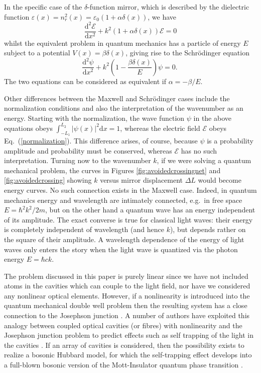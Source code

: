 \documentclass[twocolumn,english,pra,aps,superscriptaddress,floatfix]{revtex4-1}
\begin{document}
In the specific case of the $\delta$-function mirror, which is described by the dielectric function $\varepsilon(x)=n_{r}^{2}(x)=\varepsilon_{0}(1+ \alpha \delta(x))$, we have
\begin{equation}
\frac{\mathrm{d}^2 \mathcal{E}}{\mathrm{d} x^2}+ k^2(1+\alpha \delta(x)) \mathcal{E}=0
\label{eq:maxwelltimeindependent}
\end{equation}
whilst the equivalent problem in quantum mechanics has a particle of energy $E$ subject to a potential $V(x)=\beta \delta(x)$, giving rise to the
Schr\"{o}dinger equation 
\begin{equation}
\frac{\mathrm{d}^2 \psi}{\mathrm{d} x^2}+ k^2 \left(1- \frac{\beta \delta(x)}{E} \right) \psi=0 .\
\label{eq:schrodingertimeindependent}
\end{equation}
The two equations can be considered as equivalent if $\alpha = - \beta/E $.

Other differences between the Maxwell and Schr\"{o}dinger cases include the normalization conditions and also the interpretation of the wavenumber as an energy. Starting with the normalization, the wave function $\psi$ in the above equations  obeys $\int_{-L_{1}}^{L_{2}} \vert \psi(x) \vert^2 \mathrm{d} x = 1$, whereas the electric field $\mathcal{E}$ obeys Eq.\ (\ref{normalization}). This difference arises, of course, because $\psi$ is a probability amplitude and probability must be conserved, whereas $\mathcal{E}$ has no such interpretation. Turning now to the wavenumber $k$, if we were solving a quantum mechanical problem, the curves in Figures \ref{fig:avoidedcrossingnet} and \ref{fig:avoidedcrossing} showing $k$  versus mirror displacement $\Delta L$ would become energy curves. No such connection exists in the Maxwell case. Indeed, in quantum mechanics energy and wavelength are intimately connected, e.g.\ in free space $E=\hbar^{2}k^2/2m$, but on the other hand a quantum wave has an energy independent of its amplitude.  The exact converse is true for classical light waves: their energy is completely independent of wavelength (and hence $k$), but depends rather on the square of their amplitude.
A wavelength dependence of the energy of light waves only enters the story when the light wave is quantized via the photon energy $E=\hbar ck$.

The problem discussed in this paper is purely linear since we have not included atoms in the cavities which can couple to the light field, nor have we considered any nonlinear optical elements. However, if a nonlinearity is introduced into the quantum mechanical double well problem then the resulting system has a close connection to the Josephson junction \cite{smerzi97}. A number of authors have exploited this analogy between coupled optical cavities (or fibres) with nonlinearity and the Josephson junction problem to predict effects such as self trapping of the light in the cavities \cite{larson10,chefles95,gerace09}. If an array of cavities is considered, then the possibility exists to realize a bosonic Hubbard model, for which the self-trapping effect develops into a full-blown bosonic version of the Mott-Insulator quantum phase transition \cite{hartmann06,greentree06}.
  
\end{document}
